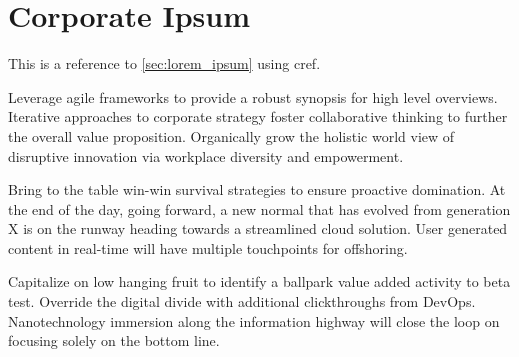 \section{Corporate Ipsum}
\label{sec:corporate_ipsum}

This is a reference to \cref{sec:lorem_ipsum} using cref.

Leverage agile frameworks to provide a robust synopsis for high level overviews. Iterative approaches to corporate strategy foster collaborative thinking to further the overall value proposition. Organically grow the holistic world view of disruptive innovation via workplace diversity and empowerment.

Bring to the table win-win survival strategies to ensure proactive domination. At the end of the day, going forward, a new normal that has evolved from generation X is on the runway heading towards a streamlined cloud solution. User generated content in real-time will have multiple touchpoints for offshoring.

Capitalize on low hanging fruit to identify a ballpark value added activity to beta test. Override the digital divide with additional clickthroughs from DevOps. Nanotechnology immersion along the information highway will close the loop on focusing solely on the bottom line.
\cite{corporateIpsum}